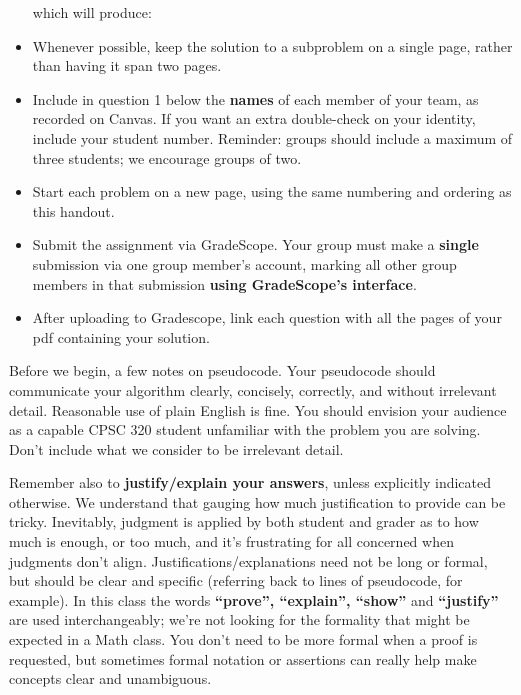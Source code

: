 \documentclass[11pt]{article}
\begin{document}
\begin{itemize}
which will produce:

\begin{soln}
\end{soln}

\item
Whenever possible, keep the solution to a subproblem on a single page, rather than having it span two pages.  

\item Include in question 1 below the \textbf{names} of each member
  of your team, as recorded on Canvas. If you want an extra
double-check on your identity, include your student number.
Reminder: groups should include a
maximum of three students; we encourage groups of two.
\item 
Start each problem on a new page, using the same numbering and ordering as this
handout.
\item
  Submit the assignment via GradeScope.
  Your group must make a \textbf{single} submission via one group member's account, marking all other group members in that submission \textbf{using GradeScope's interface}. 
\item
After uploading to Gradescope, link each question with all the pages of your pdf containing your solution.
\end{itemize}

Before  we  begin, a  few  notes  on pseudocode. Your
pseudocode should  communicate your
algorithm  clearly,  concisely,  correctly, and  without  irrelevant  detail.
Reasonable  use of  plain  English is  fine. You  should
envision your  audience as  a capable  CPSC 320  student unfamiliar  with the
problem you are solving. Don't
include what we consider to  be irrelevant detail.

Remember also to \textbf{justify/explain your answers}, unless explicitly indicated otherwise.  We understand
that gauging how much justification to provide can be tricky.
Inevitably, judgment is applied by both student and grader as to how
much is enough, or too much, and it's frustrating for all concerned when judgments
don't align.  Justifications/explanations need not be long or formal,
but should be clear and specific (referring back to lines of
pseudocode, for example). In this class the words \textbf{``prove'',
``explain'', ``show''} and \textbf{``justify''} are used interchangeably; we're
not looking for the formality that might be expected in a Math
class. You don't need to be more formal when a proof is requested, but
sometimes formal notation or assertions can really help make concepts
clear and unambiguous.
\end{document}
